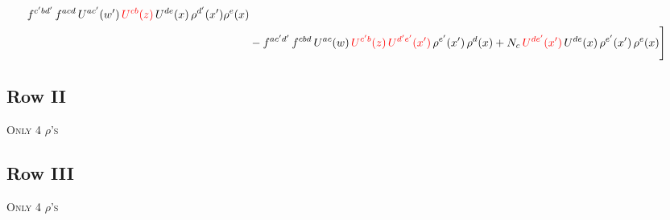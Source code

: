 \documentclass[9pt]{article}
\numberwithin{equation}{section}
\begin{document}
\begin{align}
f^{c'bd'}\,f^{acd}\,U^{ac'}(w')\,{\color{red}U^{cb}(z)}\,U^{de}(x)\,\rho^{d'}(x')\rho^{e}(x) \notag \\ & -f^{ac'd'}\,f^{cbd}\,U^{ac}(w)\,{\color{red}U^{c'b}(z)\,U^{d'e'}(x')}\,\rho^{e'}(x')\,\rho^{d}(x) +N_{c}\,{\color{red}U^{de'}(x')}\,U^{de}(x)\,\rho^{e'}(x')\,\rho^{e}(x)\Bigg]
\end{align}
\subsection{Row II\,}
\textsc{Only 4 $\rho$'s}
\subsection{Row III\,}
\textsc{Only 4 $\rho$'s}
\end{document}
